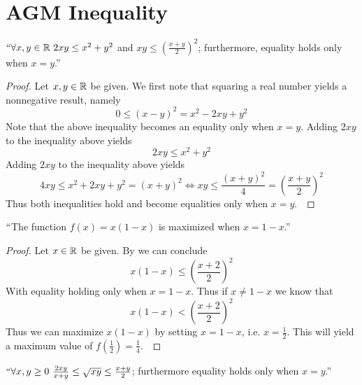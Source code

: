     \section{AGM Inequality}
        \begin{theorem}
            \label{AGM Inequality 1}
            $``\forall x, y \in \mathbb{R} \ 2xy \le x^2 + y^2$ and $xy \le \left(\frac{x + y}{2}\right)^2$;
            furthermore, equality holds only when $x = y$.''
        \end{theorem}
        \begin{proof}
            Let $x, y \in \mathbb{R}$ be given. We first note that squaring a real number
            yields a nonnegative result, namely
            \[
                0 \le (x - y)^2 = x^2 - 2xy + y^2
            \]
            Note that the above inequality becomes an equality only when $x = y$.
            Adding $2xy$ to the inequality above yields
            \begin{equation}
                2xy \le x^2 + y^2
            \end{equation}
            Adding $2xy$ to the inequality above yields
            \begin{equation}
                4xy \le x^2 + 2xy + y^2 = (x + y)^2 \iff xy \le \frac{(x + y)^2}{4}
                                        = \left(\frac{x + y}{2}\right)^2
            \end{equation}
            Thus both inequalities hold and become equalities only when $x = y$.~\QED
        \end{proof}
        \begin{corollary}
            $``$The function $f(x) = x(1 - x)$ is maximized when $x = 1 - x$.''
        \end{corollary}
        \begin{proof}
            Let $x \in \mathbb{R}$ be given. By  we can conclude
            \[
                x(1 - x) \le \left(\frac{x + 2}{2}\right)^2
            \]
            With equality holding only when $x = 1 - x$. Thus if $x \neq 1 - x$ we know that
            \[
                x(1 - x) <  \left(\frac{x + 2}{2}\right)^2
            \]
            Thus we can maximize $x(1 - x)$ by setting $x = 1 - x$, i.e. $x = \frac{1}{2}$.
            This will yield a maximum value of $f(\frac{1}{2}) = \frac{1}{4}$.~\QED
        \end{proof}
        \begin{theorem}
            $``\forall x, y \ge 0 \ \frac{2xy}{x + y} \le \sqrt{xy} \le \frac{x + y}{2}$;
            furthermore equality holds only when $x = y$.''
        \end{theorem}
